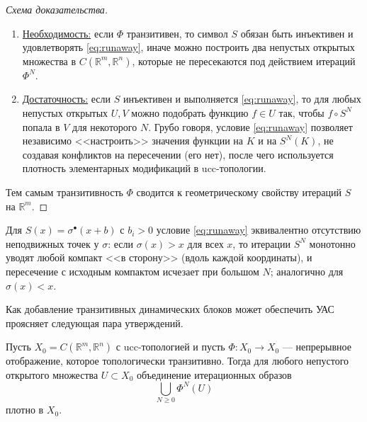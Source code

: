 \documentclass[../NDCNNAI_main.tex]{subfiles}
\begin{document}
\begin{proof}[Схема доказательства]
\leavevmode
\begin{enumerate}
\item \underline{Необходимость:} если $\Phi$ транзитивен, то символ $S$ обязан быть инъективен и удовлетворять \eqref{eq:runaway},
иначе можно построить два непустых открытых множества в $C(\mathbb{R}^m,\mathbb{R}^n)$, которые не пересекаются
под действием итераций $\Phi^N$.
\item \underline{Достаточность:} если $S$ инъективен и выполняется \eqref{eq:runaway}, то для любых непустых открытых $U,V$
можно подобрать функцию $f\in U$ так, чтобы $f\circ S^N$ попала в $V$ для некоторого $N$.
Грубо говоря, условие \eqref{eq:runaway} позволяет независимо <<настроить>> значения функции на $K$ и на $S^N(K)$,
не создавая конфликтов на пересечении (его нет), после чего используется плотность элементарных модификаций
в ucc-топологии.
\end{enumerate}
Тем самым транзитивность $\Phi$ сводится к геометрическому свойству итераций $S$ на $\mathbb{R}^m$.
\end{proof}

\begin{remark}
Для $S(x)=\sigma^\bullet(x+b)$ с $b_i>0$ условие \eqref{eq:runaway} эквивалентно отсутствию неподвижных точек у $\sigma$:
если $\sigma(x)>x$ для всех $x$, то итерации $S^N$ монотонно уводят любой компакт <<в сторону>> (вдоль каждой координаты),
и пересечение с исходным компактом исчезает при большом $N$; аналогично для $\sigma(x)<x$.  
\end{remark}

Как добавление транзитивных динамических блоков может обеспечить УАС проясняет следующая пара утверждений.
\begin{proposition}
Пусть $X_0=C(\mathbb{R}^m,\mathbb{R}^n)$ с ucc-топологией и пусть $\Phi\colon X_0\to X_0$ --- непрерывное отображение,
которое топологически транзитивно. Тогда для любого непустого открытого множества $U\subset X_0$ объединение
итерационных образов
\[
\bigcup_{N\ge 0}\Phi^N(U)
\]
плотно в $X_0$.
\end{proposition}
\end{document}
